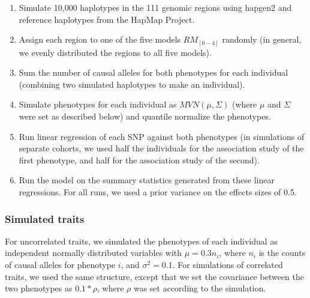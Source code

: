 \documentclass[11pt,titlepage]{article}
\begin{document}
\begin{enumerate}
\item Simulate 10,000 haplotypes in the 111 genomic regions using hapgen2 \citep{Su:2011aa} and reference haplotypes from the HapMap Project. 
\item Assign each region to one of the five models $RM_{[0-4]}$ randomly (in general, we evenly distributed the regions to all five models).
\item Sum the number of causal alleles for both phenotypes for each individual (combining two simulated haplotypes to make an individual).
\item Simulate phenotypes for each individual as $MVN(\mu, \Sigma)$ (where $\mu$ and $\Sigma$ were set as described below) and quantile normalize the phenotypes. 
\item Run linear regression of each SNP against both phenotypes (in simulations of separate cohorts, we used half the individuals for the association study of the first phenotype, and half for the association study of the second).
\item Run the model on the summary statistics generated from these linear regressions. For all runs, we used a prior variance on the effects sizes of 0.5.
\end{enumerate}

\subsubsection{Simulated traits}
For uncorrelated traits, we simulated the phenotypes of each individual as independent normally distributed variables with $\mu = 0.3 n_i$, where $n_i$ is the counts of causal alleles for phenotype $i$, and $\sigma^2 = 0.1$. For simulations of correlated traits, we used the same structure, except that we set the covariance between the two phenotypes as $0.1*\rho$, where $\rho$ was set according to the simulation.
\end{document}

